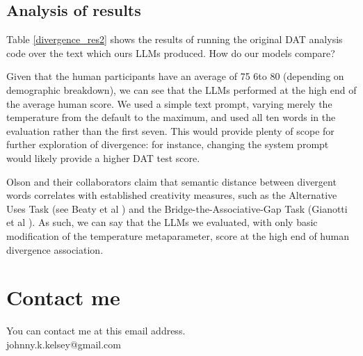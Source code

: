 \documentclass[9pt,a4paper,twoside]{rho-class/rho}
\begin{document}
\subsection{Analysis of results}

Table \ref{divergence_res2} shows the results of running the original DAT analysis code over the text which ours LLMs produced. How do our models compare?  

Given that the human participants have an average of 75 6to 80 (depending on demographic breakdown), we can see that the LLMs performed at the high end of the average human score. We used a simple text prompt, varying merely the temperature from the default to the maximum, and used all ten words in the evaluation rather than the first seven. This would provide plenty of scope for further exploration of divergence: for instance, changing the system prompt would likely provide a higher DAT test score.

Olson and their collaborators claim that semantic distance between divergent words correlates with established creativity measures, such as the Alternative Uses Task (see Beaty et al \cite{Beaty_2022}) and the Bridge-the-Associative-Gap Task (Gianotti et al \cite{Gianotti_2001}). As such, we can say that the LLMs we evaluated, with only basic modification of the temperature metaparameter, score at the high end of human divergence association. 

\section{Contact me}

    You can contact me at this email address.\\
    
    \faEnvelope[regular]\hspace{7pt}johnny.k.kelsey@gmail.com \\

\printbibliography

\end{document}

